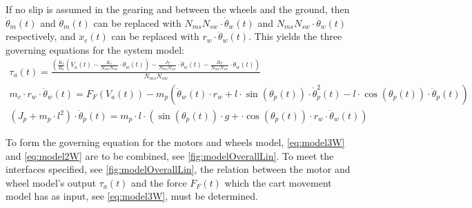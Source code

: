 If no slip is assumed in the gearing and between the wheels and the ground, then $\dot \theta_m(t)$ and $\ddot \theta_m(t)$ can be replaced with $N_{ms}N_{sw} \cdot \dot \theta_w(t)$ and $N_{ms}N_{sw} \cdot \ddot \theta_w(t)$ respectively, and $\ddot x_c(t)$ can be replaced with $r_w \cdot \ddot \theta_w(t)$. This yields the three governing equations for the system model:
\begin{align}
\tau_a(t) =\frac{\left( \frac{K_t}{R_a} \left( V_a(t) - \frac{K_e }{N_{ms} N_{sw}} \cdot \dot\theta_w(t) \right) - \frac{J_{T}}{N_{ms} N_{sw}} \cdot \ddot\theta_w(t) - \frac{B_{T}}{N_{ms} N_{sw}} \cdot \dot\theta_w(t) \right)}{N_{ms} N_{sw}}
\label{eq:model3W}\\
m_c \cdot r_w \cdot \ddot \theta_w(t) = F_F(V_a(t)) - m_p\left(\ddot \theta_w(t) \cdot r_w + l \cdot \sin(\theta_p(t))\cdot \dot\theta_p^2(t) - l \cdot \cos(\theta_p(t))\cdot \ddot\theta_p(t)\right)\label{eq:model2W}\\
(J_p+m_p\cdot l^2)\cdot \ddot \theta_p(t) = m_p \cdot l \cdot \left( \sin(\theta_p(t)) \cdot g+\cdot \cos(\theta_p(t)) \cdot r_w \cdot \ddot \theta_w(t) \right) \label{eq:model1W}
\end{align}

To form the governing equation for the motors and wheels model, \autoref{eq:model3W} and \autoref{eq:model2W} are to be combined, see \autoref{fig:modelOverallLin}. 
To meet the interfaces specified, see \autoref{fig:modelOverallLin}, the relation between the motor and wheel model's output $\tau_a(t)$ and the force $F_F(t)$ which the cart movement model has as input, see \autoref{eq:model3W}, must be determined. 

